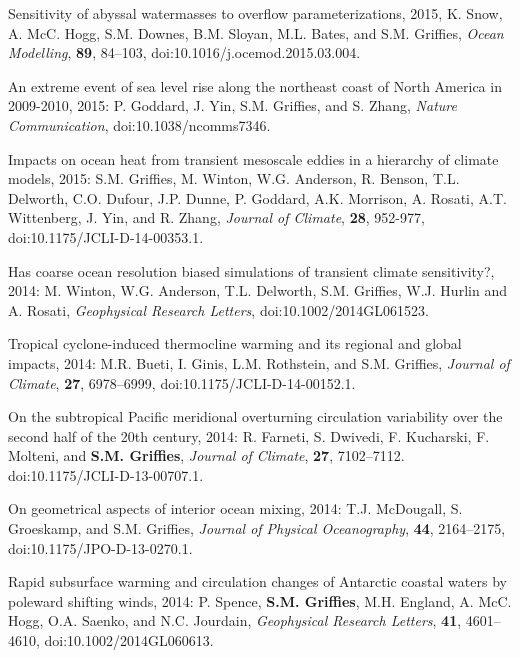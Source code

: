 \begin{etaremune}
\item Sensitivity of abyssal watermasses to overflow
  parameterizations, 2015, K. Snow, A. McC. Hogg, S.M. Downes,  B.M. Sloyan, M.L. Bates, and S.M. Grif\/f\/ies, {\it Ocean Modelling}, {\bf 89}, 84--103,
  doi:10.1016/j.ocemod.2015.03.004.

\item An extreme event of sea level rise along the northeast coast of North America in 2009-2010, 2015: P.  Goddard, J. Yin, S.M. Grif\/f\/ies, and S. Zhang, {\it Nature Communication}, doi:10.1038/ncomms7346.

\item Impacts on ocean heat from transient mesoscale eddies in a hierarchy of climate models, 2015: S.M. Grif\/f\/ies, M. Winton, W.G. Anderson, R. Benson, T.L. Delworth, C.O. Dufour, J.P. Dunne, P. Goddard, A.K. Morrison, A. Rosati, A.T. Wittenberg, J. Yin, and R. Zhang, {\it Journal of Climate}, {\bf 28}, 952-977, doi:10.1175/JCLI-D-14-00353.1.

\item Has coarse ocean resolution biased simulations of transient climate sensitivity?, 2014: M.  Winton, W.G. Anderson, T.L. Delworth, S.M. Grif\/f\/ies, W.J. Hurlin and A. Rosati, {\it Geophysical Research Letters}, doi:10.1002/2014GL061523.

\item Tropical cyclone-induced thermocline warming and its regional
  and global impacts, 2014: M.R. Bueti, I. Ginis, L.M. Rothstein, and
  S.M. Grif\/f\/ies, {\it Journal of Climate}, {\bf 27},
  6978--6999, doi:10.1175/JCLI-D-14-00152.1.

\item On the subtropical Pacific meridional overturning circulation
  variability over the second half of the 20th century, 2014:
  R. Farneti, S. Dwivedi, F. Kucharski, F. Molteni, and {\bf
    S.M. Grif\/f\/ies}, {\it Journal of Climate}, {\bf 27},
  7102--7112.  doi:10.1175/JCLI-D-13-00707.1.

\item On geometrical aspects of interior ocean mixing, 2014:
  T.J. McDougall, S. Groeskamp, and S.M. Grif\/f\/ies, {\it
    Journal of Physical Oceanography}, {\bf 44}, 2164--2175,
  doi:10.1175/JPO-D-13-0270.1.

\item Rapid subsurface warming and circulation changes of Antarctic
  coastal waters by poleward shifting winds, 2014: P. Spence, {\bf
    S.M. Grif\/f\/ies}, M.H. England, A. McC. Hogg, O.A. Saenko, and
  N.C. Jourdain, {\it Geophysical Research Letters}, {\bf 41},
  4601--4610, doi:10.1002/2014GL060613.


\end{etaremune}
